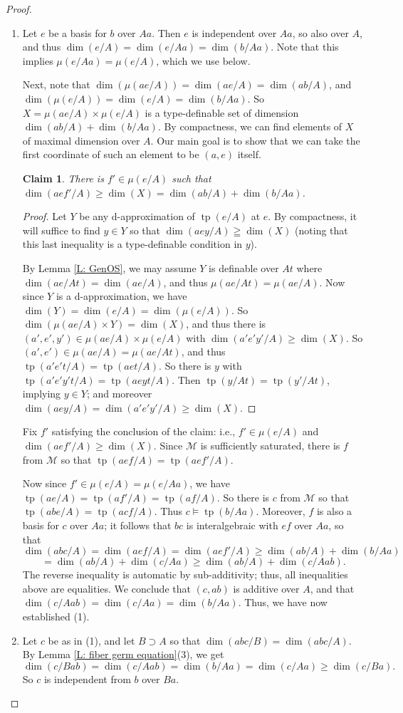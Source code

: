 \documentclass{amsart}
\newtheorem{claim}[theorem]{Claim}
\theoremstyle{definition}
\newcommand{\tp}{\operatorname{tp}}
\begin{document}
\begin{proof}
\begin{enumerate}
    \item Let $e$ be a basis for $b$ over $Aa$. Then $e$ is independent over $Aa$, so also over $A$, and thus $\dim(e/A)=\dim(e/Aa)=\dim(b/Aa)$. Note that this implies $\mu(e/Aa)=\mu(e/A)$, which we use below.

Next, note that $\dim(\mu(ae/A))=\dim(ae/A)=\dim(ab/A)$, and $\dim(\mu(e/A))=\dim(e/A)=\dim(b/Aa)$. So $X=\mu(ae/A)\times\mu(e/A)$ is a type-definable set of dimension $\dim(ab/A)+\dim(b/Aa)$. By compactness, we can find elements of $X$ of maximal dimension over $A$. Our main goal is to show that we can take the first coordinate of such an element to be $(a,e)$ itself. 

\begin{claim} There is $f'\in\mu(e/A)$ such that $\dim(aef'/A)\geq\dim(X)=\dim(ab/A)+\dim(b/Aa)$.
\end{claim}
\begin{proof}
    Let $Y$ be any d-approximation of $\tp(e/A)$ at $e$. By compactness, it will suffice to find $y\in Y$ so that $\dim(aey/A)\geqq\dim(X)$ (noting that this last inequality is a type-definable condition in $y$).

    By Lemma \ref{L: GenOS}, we may assume $Y$ is definable over $At$ where $\dim(ae/At)=\dim(ae/A)$, and thus $\mu(ae/At)=\mu(ae/A)$. Now since $Y$ is a d-approximation, we have $\dim(Y)=\dim(e/A)=\dim(\mu(e/A))$. So $\dim(\mu(ae/A)\times Y)=\dim(X)$, and thus there is $(a',e',y')\in\mu(ae/A)\times\mu(e/A)$ with $\dim(a'e'y'/A)\geq\dim(X)$. So $(a',e')\in\mu(ae/A)=\mu(ae/At)$, and thus $\tp(a'e't/A)=\tp(aet/A)$. So there is $y$ with $\tp(a'e'y't/A)=\tp(aeyt/A)$. Then $\tp(y/At)=\tp(y'/At)$, implying $y\in Y$; and moreover $\dim(aey/A)=\dim(a'e'y'/A)\geq\dim(X)$.    
\end{proof}

Fix $f'$ satisfying the conclusion of the claim: i.e., $f'\in\mu(e/A)$ and $\dim(aef'/A)\geq\dim(X)$. Since $\mathcal M$ is sufficiently saturated, there is $f$ from $\mathcal M$ so that $\tp(aef/A)=\tp(aef'/A)$. 





    Now since $f'\in\mu(e/A)=\mu(e/Aa)$, we have $\tp(ae/A)=\tp(af'/A)=\tp(af/A)$. So there is $c$ from $\mathcal M$ so that $\tp(abe/A)=\tp(acf/A)$. Thus $c\models\tp(b/Aa)$. Moreover, $f$ is also a basis for $c$ over $Aa$; it follows that $bc$ is interalgebraic with $ef$ over $Aa$, so that $$\dim(abc/A)=\dim(aef/A)=\dim(aef'/A)\geq\dim(ab/A)+\dim(b/Aa)$$ $$=\dim(ab/A)+\dim(c/Aa)\geq\dim(ab/A)+\dim(c/Aab).$$ The reverse inequality is automatic by sub-additivity; thus, all inequalities above are equalities. We conclude that $(c,ab)$ is additive over $A$, and that $\dim(c/Aab)=\dim(c/Aa)=\dim(b/Aa)$. Thus, we have now established (1). 
    \item Let $c$ be as in (1), and let $B\supset A$ so that $\dim(abc/B)=\dim(abc/A)$. By Lemma \ref{L: fiber germ equation}(3), we get $$\dim(c/Bab)=\dim(c/Aab)=\dim(b/Aa)=\dim(c/Aa)\geq\dim(c/Ba).$$ So $c$ is independent from $b$ over $Ba$.


\end{enumerate}
\end{proof}
\end{document}
